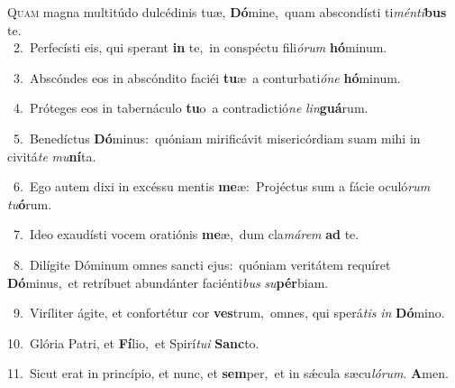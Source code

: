 \lettrine{\initial\textcolor{\initialcolor}{Q}}{uam} magna multitúdo dulcédinis tuæ, \textbf{Dó}\-mine,~\star quam abscondísti ti\-\textit{mén}\-\textit{ti}\textbf{bus} te.\\
{\numbfont\textcolor{\numbcolor}{~2.}}~Perfecísti eis, qui sperant \textbf{in} te,~\star in conspéctu fili\-\textit{ó}\-\textit{rum} \textbf{hó}\-minum.\par
{\numbfont\textcolor{\numbcolor}{~3.}}~Abscóndes eos in abscóndito faciéi \textbf{tu}\-æ~\star a conturbati\-\textit{ó}\-\textit{ne} \textbf{hó}\-minum.\par
{\numbfont\textcolor{\numbcolor}{~4.}}~Próteges eos in tabernáculo \textbf{tu}\-o~\star a contradictió\textit{ne} \textit{lin}\-\textbf{guá}rum.\par
{\numbfont\textcolor{\numbcolor}{~5.}}~Benedíctus \textbf{Dó}\-minus:~\star quóniam mirificávit misericórdiam suam mihi in civitá\textit{te} \textit{mu}\-\textbf{ní}ta.\par
{\numbfont\textcolor{\numbcolor}{~6.}}~Ego autem dixi in excéssu mentis \textbf{me}\-æ:~\star Projéctus sum a fácie oculó\textit{rum} \textit{tu}\-\textbf{ó}rum.\par
{\numbfont\textcolor{\numbcolor}{~7.}}~Ideo exaudísti vocem oratiónis \textbf{me}\-æ,~\star dum cla\-\textit{má}\-\textit{rem} \textbf{ad} te.\par
{\numbfont\textcolor{\numbcolor}{~8.}}~Dilígite Dóminum omnes sancti ejus:~\dagger quóniam veritátem requíret \textbf{Dó}\-minus,~\star et retríbuet abundánter faciénti\textit{bus} \textit{su}\-\textbf{pér}biam.\par
{\numbfont\textcolor{\numbcolor}{~9.}}~Viríliter ágite, et confortétur cor \textbf{ves}\-trum,~\star omnes, qui sperá\textit{tis} \textit{in} \textbf{Dó}\-mino.\par
{\numbfont\textcolor{\numbcolor}{10.}}~Glória Patri, et \textbf{Fí}\-lio,~\star et Spirí\-\textit{tu}\-\textit{i} \textbf{Sanc}\-to.\par
{\numbfont\textcolor{\numbcolor}{11.}}~Sicut erat in princípio, et nunc, et \textbf{sem}\-per,~\star et in sǽcula sæcu\-\textit{ló}\-\textit{rum}. \textbf{A}\-men.\par
